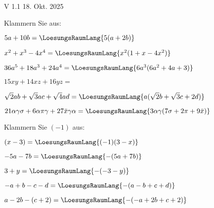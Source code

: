
\renewcommand{\bbwAufgabenBlockID}{A1F}

\renewcommand{\metaHeaderLine}{Aufgabenblatt}
\renewcommand{\arbeitsblattTitel}{Faktorisieren}



\begin{center}{\tiny{V 1.1 18. Okt. 2025}}\end{center}
\arbeitsblattHeader{}


Klammern Sie aus:
\begin{bbwAufgabenBlock}
\item $5a+10b = \LoesungsRaumLang{5(a+2b)}$
\item $x^2+x^3-4x^4 =\LoesungsRaumLang{x^2(1+x-4x^2)}$
\item $36a^5+18a^3+24a^4 = \LoesungsRaumLang{6a^3(6a^2+4a+3)}$
\item $15xy+14xz+16yz = $\noTRAINER{\newpage}
\item $\sqrt{2}ab+\sqrt{3}ac + \sqrt{4}ad= \LoesungsRaumLang{a(\sqrt{2}b + \sqrt{3}c + 2d)}$
\item $21\alpha\gamma\sigma + 6\alpha\pi\gamma + 27\bar{x}\gamma\alpha = \LoesungsRaumLang{3\alpha\gamma(7\sigma+2\pi+9\bar{x})}$

\end{bbwAufgabenBlock}

\newpage


Klammern Sie $(-1)$ aus:


\begin{bbwAufgabenBlock}
\item $(x-3) = \LoesungsRaumLang{(-1)(3-x)}$
\item $-5a-7b = \LoesungsRaumLang{-(5a+7b)}$
\item $3+y = \LoesungsRaumLang{-(-3-y)}$
\item $-a+b-c-d = \LoesungsRaumLang{-(a-b+c+d)}$\noTRAINER{\newpage}
\item $a-2b-(c+2) = \LoesungsRaumLang{-(-a+2b+c+2)}$
\end{bbwAufgabenBlock}

\newpage


